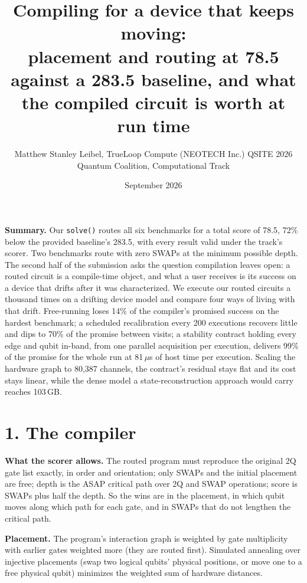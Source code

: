 \documentclass[10pt,letterpaper]{article}
\title{\vspace{-18pt}\large Compiling for a device that keeps moving:\\ placement and routing at 78.5 against a 283.5 baseline, and what the compiled circuit is worth at run time}
\author{\normalsize Matthew Stanley Leibel, TrueLoop Compute (NEOTECH Inc.) \quad QSITE 2026 Quantum Coalition, Computational Track}
\date{\normalsize September 2026}
\begin{document}
\maketitle\vspace{-16pt}

\textbf{Summary.} Our \texttt{solve()} routes all six benchmarks for a total score of 78.5, 72\% below the provided baseline's 283.5, with every result valid under the track's scorer. Two benchmarks route with zero SWAPs at the minimum possible depth. The second half of the submission asks the question compilation leaves open: a routed circuit is a compile-time object, and what a user receives is its success on a device that drifts after it was characterized. We execute our routed circuits a thousand times on a drifting device model and compare four ways of living with that drift. Free-running loses 14\% of the compiler's promised success on the hardest benchmark; a scheduled recalibration every 200 executions recovers little and dips to 70\% of the promise between visits; a stability contract holding every edge and qubit in-band, from one parallel acquisition per execution, delivers 99\% of the promise for the whole run at 81\,$\mu$s of host time per execution. Scaling the hardware graph to 80,387 channels, the contract's residual stays flat and its cost stays linear, while the dense model a state-reconstruction approach would carry reaches 103\,GB.

\section*{1. The compiler}
\textbf{What the scorer allows.} The routed program must reproduce the original 2Q gate list exactly, in order and orientation; only SWAPs and the initial placement are free; depth is the ASAP critical path over 2Q and SWAP operations; score is SWAPs plus half the depth. So the wins are in the placement, in which qubit moves along which path for each gate, and in SWAPs that do not lengthen the critical path.

\textbf{Placement.} The program's interaction graph is weighted by gate multiplicity with earlier gates weighted more (they are routed first). Simulated annealing over injective placements (swap two logical qubits' physical positions, or move one to a free physical qubit) minimizes the weighted sum of hardware distances.
\end{document}
